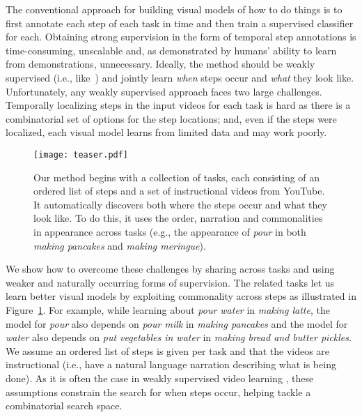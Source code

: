 \documentclass[10pt,twocolumn,letterpaper]{article}
\begin{document}
The conventional approach for building visual models of how to do things \cite{carreira17quovadis,simonyan2014two,Wang13action}
is to first annotate each step of each task in time and then train a
supervised classifier for each. Obtaining strong supervision in the
form of temporal step annotations is
time-consuming, unscalable and, as demonstrated by humans' ability to learn
from demonstrations, unnecessary. Ideally, the method should be
weakly supervised (i.e., like~\cite{Alayrac15Unsupervised, feifei2016connectionist, kuehne17weakly, Sener15unsupervised}) and jointly learn {\it when} steps
occur and {\it what} they look like. Unfortunately, any weakly supervised
approach faces two large challenges. Temporally localizing steps in the
input videos for each task is hard as there is a combinatorial set of
options for the step locations; and, even if the steps were localized,
each  visual model learns from limited data and may work poorly.

\begin{figure}
\texttt{[image: teaser.pdf]}
\caption{Our method begins with a collection of tasks, each consisting of
an ordered list of steps and a set of instructional videos from YouTube.
It automatically discovers both where the steps occur
and what they look like. To do this, it uses the order, narration and commonalities
in appearance across tasks (e.g., the appearance of {\it pour}
in both {\it making pancakes} and {\it making meringue}).}
\label{fig:teaser}
\vspace{-0.1in}
\end{figure}

We show how to overcome these challenges by sharing across tasks and using
weaker and naturally occurring forms of supervision.  The related tasks let us
learn better visual models by exploiting commonality across steps as
illustrated in Figure~\ref{fig:teaser}.  For example, while learning about {\it
pour water} in {\it making latte}, the model for {\it pour} also depends on
{\it pour milk} in {\it making pancakes} and the model for {\it water} also
depends on {\it put vegetables in water} in {\it making bread and butter pickles}.
We assume an ordered list of steps is given per task and that the videos are
instructional (i.e., have a natural language narration describing what is being
done).  As it is often the case in weakly supervised video learning
\cite{alayrac16objectstates,feifei2016connectionist,Sener15unsupervised}, these assumptions
constrain the search for when steps occur, helping tackle a combinatorial search space.
\end{document}

